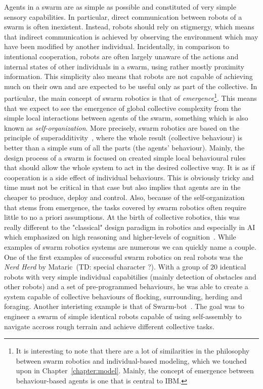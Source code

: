     Agents in a swarm are as simple as possible and constituted of very simple sensory capabilities. In particular, direct communication between robots of a swarm is often inexistent. Instead, robots should rely on stigmergy, which means that indirect communication is achieved by observing the environment which may have been modified by another individual. Incidentally, in comparison to intentional cooperation, robots are often largely unaware of the actions and internal states of other individuals in a swarm, using rather mostly proximity information. This simplicity also means that robots are not capable of achieving much on their own and are expected to be useful only as part of the collective. In particular, the main concept of swarm robotics is that of \emph{emergence}\footnote{It is interesting to note that there are a lot of similarities in the philosophy between swarm robotics and individual-based modeling, which we touched upon in Chapter~\ref{chapter:model}. Mainly, the concept of emergence between behaviour-based agents is one that is central to IBM.}. This means that we expect to see the emergence of global collective complexity from the simple local interactions between agents of the swarm, something which is also known as \emph{self-organization}. More precisely, swarm robotics are based on the principle of superadditivity~\cite{Parker2008}, where the whole result (collective behaviour) is better than a simple sum of all the parts (the agents' behaviour). Mainly, the design process of a swarm is focused on created simple local behavioural rules that should allow the whole system to act in the desired collective way. It is as if cooperation is a side effect of individual behaviours. This is obviously tricky and time must not be critical in that case but also implies that agents are in the cheaper to produce, deploy and control. Also, because of the self-organization that stems from emergence, the tasks covered by swarm robotics often require little to no a priori assumptions. At the birth of collective robotics, this was really different to the "classical" design paradigm in robotics and especially in AI which emphasized on high reasoning and higher-levels of cognition~\cite{Bonabeau1999}. While examples of swarm robotics systems are numerous we can quickly name a couple. One of the first examples of successful swarm robotics on real robots was the \emph{Nerd Herd} by Mataric~\cite{Mataric1995}(TD: special character ?). With a group of $20$ identical robots with very simple individual capabitilies (mainly detection of obstacles and other robots) and a set of pre-programmed behaviours, he was able to create a system capable of collective behaviours of flocking, surrounding, herding and foraging. Another interisting example is that of Swarm-bot~\cite{Mondada2004, Dorigo2004}. The goal was to engineer a swarm of simple identical robots capable of using self-assembly to navigate accross rough terrain and achieve different collective tasks.

